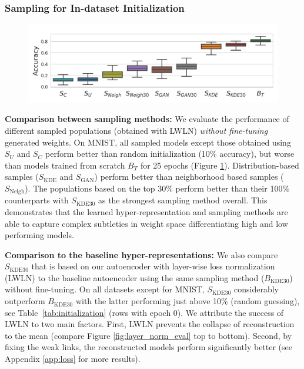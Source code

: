 \documentclass{article}
\begin{document}
\subsubsection{Sampling for In-dataset Initialization}
%
\begin{figure}
\vspace{-5mm}
\includegraphics[trim=2mm 2mm 2mm 2mm, clip, width=1.0\linewidth]{figures/accuracy_distributions_samples_boxplot.png}
\vspace{-6mm}
\vspace{-2mm}
\label{fig:accuracy_distributions}    
\end{figure} 
\textbf{Comparison between sampling methods:} 
We evaluate the performance of different sampled populations (obtained with LWLN) \textit{without fine-tuning} generated weights.
On MNIST, all sampled models except those obtained using $S_U$ and $S_C$ perform better than random initialization (10\% accuracy), but worse than models trained from scratch $B_T$ for 25 epochs (Figure \ref{fig:accuracy_distributions}). 
Distribution-based samples ($S_{\text{KDE}}$ and $S_{\text{GAN}}$) perform better than neighborhood based samples ($S_{\text{Neigh}}$).
The populations based on the top 30\% perform better than their 100\% counterparts with $S_{\text{KDE30}}$ as the strongest sampling method overall. This demonstrates that the learned hyper-representation and sampling methods are able to capture complex subtleties in weight space differentiating high and low performing models.


\vspace{8pt}

\textbf{Comparison to the baseline hyper-representations:}  We also compare $S_{\text{KDE30}}$ that is based on our autoencoder with layer-wise loss normalization (LWLN) to the baseline autoencoder using the same sampling method ($B_{\text{KDE}30}$) without fine-tuning. 
On all datasets except for MNIST, $S_{\text{KDE30}}$ considerably outperform $B_{\text{KDE}30}$ with the latter performing just above 10\% (random guessing), see Table~\ref{tab:initialization} (rows with epoch 0).
We attribute the success of LWLN to two main factors.
First, LWLN prevents the collapse of reconstruction to the mean (compare Figure \ref{fig:layer_norm_eval} top to bottom). Second, by fixing the weak links, the reconstructed models perform significantly better (see Appendix \ref{app:loss} for more results).
\end{document}
